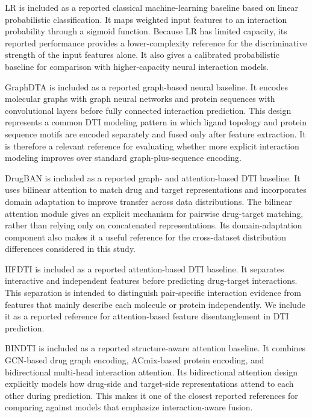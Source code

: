 LR \citep{friedman2000logistic} is included as a reported classical machine-learning baseline based on linear probabilistic classification. It maps weighted input features to an interaction probability through a sigmoid function. Because LR has limited capacity, its reported performance provides a lower-complexity reference for the discriminative strength of the input features alone. It also gives a calibrated probabilistic baseline for comparison with higher-capacity neural interaction models.

GraphDTA \citep{nguyen2021graphdta} is included as a reported graph-based neural baseline. It encodes molecular graphs with graph neural networks and protein sequences with convolutional layers before fully connected interaction prediction. This design represents a common DTI modeling pattern in which ligand topology and protein sequence motifs are encoded separately and fused only after feature extraction. It is therefore a relevant reference for evaluating whether more explicit interaction modeling improves over standard graph-plus-sequence encoding.

DrugBAN \citep{bai2023drugban} is included as a reported graph- and attention-based DTI baseline. It uses bilinear attention to match drug and target representations and incorporates domain adaptation to improve transfer across data distributions. The bilinear attention module gives an explicit mechanism for pairwise drug-target matching, rather than relying only on concatenated representations. Its domain-adaptation component also makes it a useful reference for the cross-dataset distribution differences considered in this study.

IIFDTI \citep{cheng2022iifdti} is included as a reported attention-based DTI baseline. It separates interactive and independent features before predicting drug-target interactions. This separation is intended to distinguish pair-specific interaction evidence from features that mainly describe each molecule or protein independently. We include it as a reported reference for attention-based feature disentanglement in DTI prediction.

BINDTI \citep{peng2024bindti} is included as a reported structure-aware attention baseline. It combines GCN-based drug graph encoding, ACmix-based protein encoding, and bidirectional multi-head interaction attention. Its bidirectional attention design explicitly models how drug-side and target-side representations attend to each other during prediction. This makes it one of the closest reported references for comparing against models that emphasize interaction-aware fusion.

